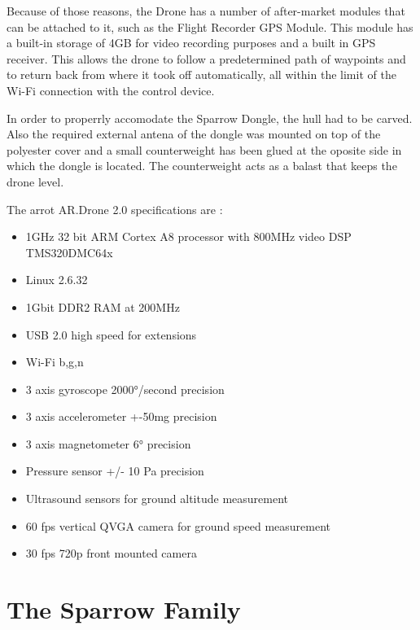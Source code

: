 Because of those reasons, the Drone has a number of after-market modules that can be attached to it, such as 
the Flight Recorder GPS Module. This module has a built-in storage of 4GB for video recording purposes and a built in GPS receiver. This allows the drone to follow a predetermined path of waypoints and to return back from where it took off automatically, all within the limit of the Wi-Fi connection with the control device.

In order to properrly accomodate the Sparrow Dongle, the hull had to be carved. Also the required external antena of the dongle was mounted on top of the polyester cover and a small counterweight  has been glued at the oposite side in which the dongle is located. The counterweight acts as a balast that keeps the drone level.
 

The arrot AR.Drone 2.0 specifications are :
\begin{itemize}



\item   1GHz 32 bit ARM Cortex A8 processor with 800MHz video DSP TMS320DMC64x
\item   Linux 2.6.32
\item   1Gbit DDR2 RAM at 200MHz
\item   USB 2.0 high speed for extensions
\item   Wi-Fi b,g,n
\item   3 axis gyroscope 2000°/second precision
\item   3 axis accelerometer +-50mg precision
\item   3 axis magnetometer 6° precision
\item   Pressure sensor +/- 10 Pa precision
\item   Ultrasound sensors for ground altitude measurement
\item   60 fps vertical QVGA camera for ground speed measurement
\item	30 fps 720p front mounted camera 	

\end{itemize}


\section{The Sparrow Family}

